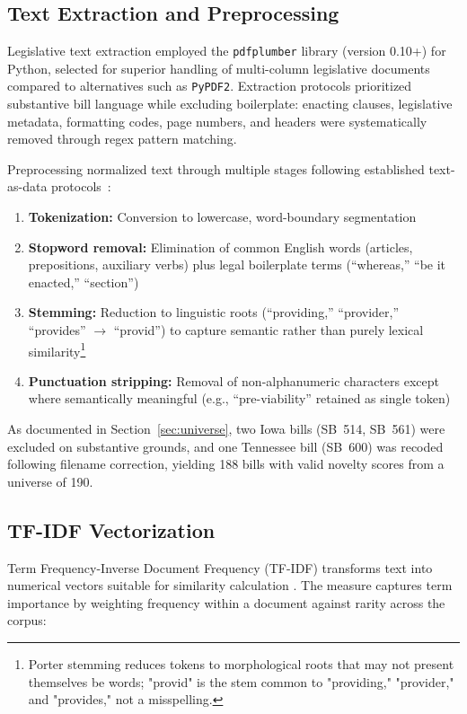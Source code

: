 \subsection{Text Extraction and Preprocessing}

Legislative text extraction employed the \texttt{pdfplumber} library (version 0.10+) for Python, selected for superior handling of multi-column legislative documents compared to alternatives such as \texttt{PyPDF2}. Extraction protocols prioritized substantive bill language while excluding boilerplate: enacting clauses, legislative metadata, formatting codes, page numbers, and headers were systematically removed through regex pattern matching.

Preprocessing normalized text through multiple stages following established text-as-data protocols~\parencite{grimmerTextDataPromise2013}:
\begin{enumerate}
    \item \textbf{Tokenization:} Conversion to lowercase, word-boundary segmentation
    \item \textbf{Stopword removal:} Elimination of common English words (articles, prepositions, auxiliary verbs) plus legal boilerplate terms (``whereas,'' ``be it enacted,'' ``section'')
    \item \textbf{Stemming:} Reduction to linguistic roots (``providing,'' ``provider,'' ``provides'' $\rightarrow$ ``provid'') to capture semantic rather than purely lexical similarity\footnote{Porter stemming reduces tokens to morphological roots that may not present themselves be words; "provid" is the stem common to "providing," "provider," and "provides," not a misspelling.}
    \item \textbf{Punctuation stripping:} Removal of non-alphanumeric characters except where semantically meaningful (e.g., ``pre-viability'' retained as single token)
\end{enumerate}

As documented in Section~\ref{sec:universe}, two Iowa bills (SB~514, SB~561) were excluded on substantive grounds, and one Tennessee bill (SB~600) was recoded following filename correction, yielding 188 bills with valid novelty scores from a universe of 190.

\subsection{TF-IDF Vectorization}
\label{tfidf}
Term Frequency-Inverse Document Frequency (TF-IDF) transforms text into numerical vectors suitable for similarity calculation \parencite{wilkersonTracingFlowPolicy2015, linderTextPolicyMeasuring2020}. The measure captures term importance by weighting frequency within a document against rarity across the corpus:


